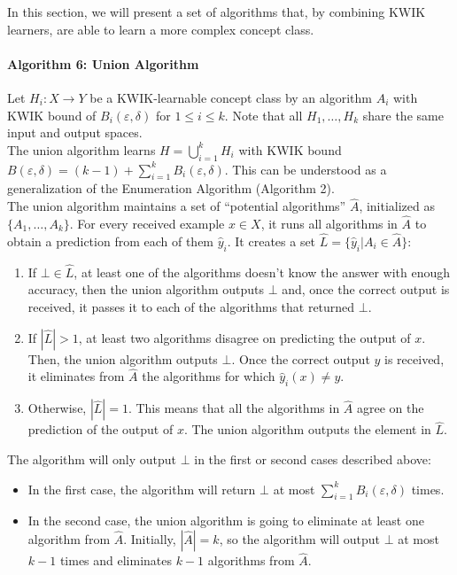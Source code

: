 
In this section, we will present a set of algorithms that, by combining KWIK
learners, are able to learn a more complex concept class.

\paragraph{Algorithm 6: Union Algorithm}
Let $H_i: X \to Y$ be a KWIK-learnable concept class by an algorithm $A_i$
with KWIK bound of $B_i(\varepsilon, \delta)$ for $1 \leq i \leq k$. Note that
all $H_1, \ldots, H_k$ share the same input and output spaces. \\

The union algorithm learns $H = \bigcup_{i=1}^k H_i$ with KWIK bound $B(\varepsilon,
\delta) = (k - 1) + \sum_{i = 1}^k B_i(\varepsilon, \delta)$. This can be
understood as a generalization of the Enumeration Algorithm (Algorithm 2). \\

The union algorithm maintains a set of ``potential algorithms'' $\hat{A}$,
initialized as $\{ A_1, \ldots, A_k \}$. For every received example
$x \in X$, it runs all algorithms in $\hat{A}$ to obtain a prediction from each
of them $\hat{y}_i$. It creates a set $\hat{L} = \{ \hat{y}_i | A_i \in \hat{A} \}$:
\begin{enumerate}
  \item If $\bot \in \hat{L}$, at least one of the algorithms doesn't know the
  answer with enough accuracy, then the union algorithm outputs $\bot$ and, once
  the correct output is received, it passes it to each of the algorithms that
  returned $\bot$.
  \item If $|\hat{L}| > 1$, at least two algorithms disagree on predicting the output of $x$.
  Then, the union algorithm outputs $\bot$. Once the correct output $y$ is
  received, it eliminates from $\hat{A}$ the algorithms for which $\hat{y}_i(x)
  \neq y$.
  \item Otherwise, $|\hat{L}| = 1$. This means that all the algorithms in
  $\hat{A}$ agree on the prediction of the output of $x$. The union algorithm outputs the element in
  $\hat{L}$.
\end{enumerate}

The algorithm will only output $\bot$ in the first or second cases described
above:
\begin{itemize}
  \item In the first case, the algorithm will return $\bot$ at most $\sum_{i = 1}^k
  B_i(\varepsilon, \delta)$ times.
  \item In the second case, the union algorithm is going to eliminate at least one
  algorithm from $\hat{A}$. Initially, $|\hat{A}| = k$, so the algorithm will
  output $\bot$ at most $k - 1$ times and eliminates $k - 1$ algorithms from
  $\hat{A}$.
\end{itemize}

